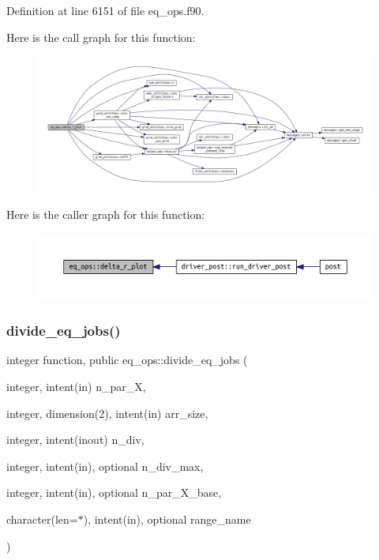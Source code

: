 Definition at line 6151 of file eq\+\_\+ops.\+f90.

Here is the call graph for this function\+:\nopagebreak
\begin{figure}[H]
\begin{center}
\leavevmode
\includegraphics[width=350pt]{namespaceeq__ops_ac0a79893900631d25b170be0abd2c131_cgraph}
\end{center}
\end{figure}
Here is the caller graph for this function\+:\nopagebreak
\begin{figure}[H]
\begin{center}
\leavevmode
\includegraphics[width=350pt]{namespaceeq__ops_ac0a79893900631d25b170be0abd2c131_icgraph}
\end{center}
\end{figure}
\mbox{\label{namespaceeq__ops_a8fae749abe55865d8135fef536a8e8f1}} 
\subsubsection{\texorpdfstring{divide\+\_\+eq\+\_\+jobs()}{divide\_eq\_jobs()}}
{\footnotesize\ttfamily integer function, public eq\+\_\+ops\+::divide\+\_\+eq\+\_\+jobs (\begin{DoxyParamCaption}\item[{integer, intent(in)}]{n\+\_\+par\+\_\+X,  }\item[{integer, dimension(2), intent(in)}]{arr\+\_\+size,  }\item[{integer, intent(inout)}]{n\+\_\+div,  }\item[{integer, intent(in), optional}]{n\+\_\+div\+\_\+max,  }\item[{integer, intent(in), optional}]{n\+\_\+par\+\_\+\+X\+\_\+base,  }\item[{character(len=$\ast$), intent(in), optional}]{range\+\_\+name }\end{DoxyParamCaption})}



